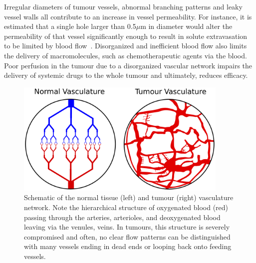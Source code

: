 Irregular diameters of tumour vessels, abnormal branching patterns and leaky vessel walls all contribute to an increase in vessel permeability.
For instance, it is estimated that a single hole larger than 0.5$\mu$m in diameter would alter the permeability of that vessel significantly enough to result in solute extravasation to be limited by blood flow~\cite{McDonald:2002ut}.
Disorganized and inefficient blood flow also limits the delivery of macromolecules, such as chemotherapeutic agents via the blood.
Poor perfusion in the tumour due to a disorganized vascular network impairs the delivery of systemic drugs to the whole tumour and ultimately, reduces efficacy. 

\begin{figure}  
 \begin{center}  
 \includegraphics[width=4in]{intro/intro-images/tumourVasculature.pdf}
 \caption{Schematic of the normal tissue (left) and tumour (right) vasculature network. 
 Note the hierarchical structure of oxygenated blood (red) passing through the arteries, arterioles, and deoxygenated blood leaving via the venules, veins. 
 In tumours, this structure is severely compromised and often, no clear flow patterns can be distinguished with many vessels ending in dead ends or looping back onto feeding vessels.}
 \label{tumourVasculature}
 \end{center}
\end{figure}

